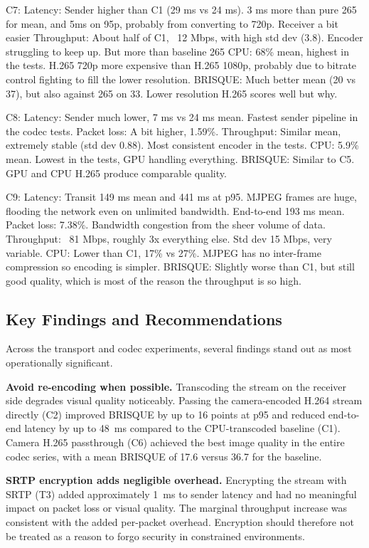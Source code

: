 C7:
Latency: Sender higher than C1 (29 ms vs 24 ms). 3 ms more than pure 265 for mean, and 5ms on 95p, probably from converting to 720p. Receiver a bit easier
Throughput: About half of C1, ~12 Mbps, with high std dev (3.8). Encoder struggling to keep up. But more than baseline 265
CPU: 68\% mean, highest in the tests. H.265 720p more expensive than H.265 1080p, probably due to bitrate control fighting to fill the lower resolution.
BRISQUE: Much better mean (20 vs 37), but also against 265 on 33. Lower resolution H.265 scores well but why.

C8:
Latency: Sender much lower, 7 ms vs 24 ms mean. Fastest sender pipeline in the codec tests.
Packet loss: A bit higher, 1.59\%.
Throughput: Similar mean, extremely stable (std dev 0.88). Most consistent encoder in the tests.
CPU: 5.9\% mean. Lowest in the tests, GPU handling everything.
BRISQUE: Similar to C5. GPU and CPU H.265 produce comparable quality.

C9:
Latency: Transit 149 ms mean and 441 ms at p95. MJPEG frames are huge, flooding the network even on unlimited bandwidth. End-to-end 193 ms mean.
Packet loss: 7.38\%. Bandwidth congestion from the sheer volume of data.
Throughput: ~81 Mbps, roughly 3x everything else. Std dev 15 Mbps, very variable.
CPU: Lower than C1, 17\% vs 27\%. MJPEG has no inter-frame compression so encoding is simpler.
BRISQUE: Slightly worse than C1, but still good quality, which is most of the reason the throughput is so high.

\subsection{Key Findings and Recommendations}\label{subsec:key-findings}

Across the transport and codec experiments, several findings stand out as most operationally significant.

\textbf{Avoid re-encoding when possible.}
Transcoding the stream on the receiver side degrades visual quality noticeably. Passing the camera-encoded H.264 stream directly (C2) improved BRISQUE by up to 16 points at p95 and reduced end-to-end latency by up to 48~ms compared to the CPU-transcoded baseline (C1). Camera H.265 passthrough (C6) achieved the best image quality in the entire codec series, with a mean BRISQUE of 17.6 versus 36.7 for the baseline.

\textbf{SRTP encryption adds negligible overhead.}
Encrypting the stream with SRTP (T3) added approximately 1~ms to sender latency and had no meaningful impact on packet loss or visual quality. The marginal throughput increase was consistent with the added per-packet overhead. Encryption should therefore not be treated as a reason to forgo security in constrained environments.

